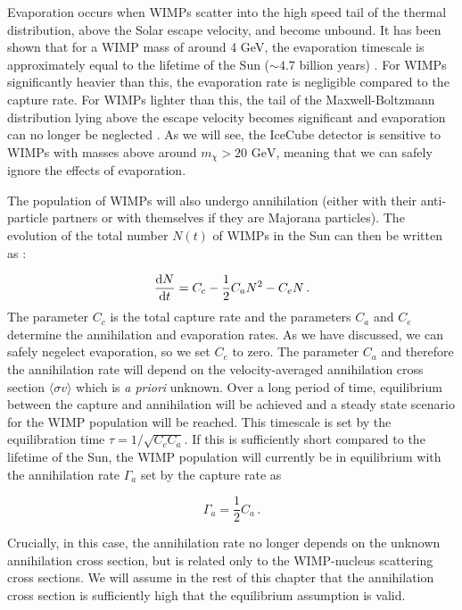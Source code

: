 Evaporation occurs when WIMPs scatter into the high speed tail of the thermal distribution, above the Solar escape velocity, and become unbound. It has been shown that for a WIMP mass of around 4 GeV, the evaporation timescale is approximately equal to the lifetime of the Sun ($\sim4.7$ billion years) \cite{Gould:1987b}. For WIMPs significantly heavier than this, the evaporation rate is negligible compared to the capture rate. For WIMPs lighter than this, the tail of the Maxwell-Boltzmann distribution lying above the escape velocity becomes significant and evaporation can no longer be neglected \cite{Krauss:1986,Busoni:2013b}. As we will see, the IceCube detector is sensitive to WIMPs with masses above around $m_\chi > 20 \textrm{ GeV} $, meaning that we can safely ignore the effects of evaporation.

The population of WIMPs will also undergo annihilation (either with their anti-particle partners or with themselves if they are Majorana particles). The evolution of the total number $N(t)$ of WIMPs in the Sun can then be written as \cite{Griest:1987}:

\begin{equation}
\frac{\mathrm{d}N}{\mathrm{d}t} = C_c - \frac{1}{2}C_a N^2 - C_e N\,.
\end{equation}
The parameter $C_c$ is the total capture rate and the parameters $C_a$ and $C_e$ determine the annihilation and evaporation rates. As we have discussed, we can safely negelect evaporation, so we set $C_e$ to zero. The parameter $C_a$ and therefore the annihilation rate will depend on the velocity-averaged annihilation cross section $\langle \sigma v \rangle$ which is \textit{a priori} unknown. Over a long period of time, equilibrium between the capture and annihilation will be achieved and a steady state scenario for the WIMP population will be reached. This timescale is set by the equilibration time $\tau = 1/\sqrt{C_c C_a}$. If this is sufficiently short compared to the lifetime of the Sun, the WIMP population will currently be in equilibrium with the annihilation rate $\Gamma_a$ set by the capture rate as

\begin{equation}
\Gamma_a = \frac{1}{2}C_a\,.
\end{equation}

Crucially, in this case, the annihilation rate no longer depends on the unknown annihilation cross section, but is related only to the WIMP-nucleus scattering cross sections. We will assume in the rest of this chapter that the annihilation cross section is sufficiently high that the equilibrium assumption is valid.

